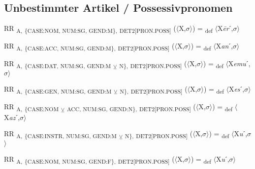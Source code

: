 {\subsection{Unbestimmter Artikel / Possessivpronomen}

\begin{exe}
 RR \textsubscript{A,} \textsubscript{\{CASE:NOM, NUM:SG, GEND:M\},} \textsubscript{DET2[PRON.POSS]} ($\langle$X,$\sigma $$\rangle$) = \textsubscript{def} $\langle$X\textit{\=er}ˊ,$\sigma $$\rangle$
\end{exe}

\begin{exe}
 RR \textsubscript{A,} \textsubscript{\{CASE:ACC, NUM:SG, GEND:M\},} \textsubscript{DET2[PRON.POSS]} ($\langle$X,$\sigma $$\rangle$) = \textsubscript{def} $\langle$X\textit{an}ˊ,$\sigma $$\rangle$
\end{exe}

\begin{exe}
 RR \textsubscript{A,} \textsubscript{\{CASE:DAT, NUM:SG, GEND:M} \textsubscript{${\veebar}$}\textsubscript{ N\},} \textsubscript{DET2[PRON.POSS]} ($\langle$X,$\sigma $$\rangle$) = \textsubscript{def} $\langle$X\textit{emu}ˊ,$\sigma $$\rangle$
\end{exe}

\begin{exe}
 RR \textsubscript{A,} \textsubscript{\{CASE:GEN, NUM:SG, GEND:M} \textsubscript{${\veebar}$}\textsubscript{ N\},} \textsubscript{DET2[PRON.POSS]} ($\langle$X,$\sigma $$\rangle$) = \textsubscript{def} $\langle$X\textit{es}ˊ,$\sigma $$\rangle$
\end{exe}

\begin{exe}
 RR \textsubscript{A,} \textsubscript{\{CASE:NOM} \textsubscript{${\veebar}$}\textsubscript{ ACC, NUM:SG, GEND:N\},} \textsubscript{DET2[PRON.POSS]} ($\langle$X,$\sigma $$\rangle$) = \textsubscript{def} $\langle$X\textit{az}ˊ,$\sigma $$\rangle$
\end{exe}

\begin{exe}
 RR \textsubscript{A,} \textsubscript{\{CASE:INSTR, NUM:SG, GEND:M} \textsubscript{${\veebar}$}\textsubscript{ N\},} \textsubscript{DET2[PRON.POSS]} ($\langle$X,$\sigma $$\rangle$) = \textsubscript{def} $\langle$X\textit{u}ˊ,$\sigma $$\rangle$
\end{exe}

\begin{exe}
 RR \textsubscript{A,} \textsubscript{\{CASE:NOM, NUM:SG, GEND:F\},} \textsubscript{DET2[PRON.POSS]} ($\langle$X,$\sigma $$\rangle$) = \textsubscript{def} $\langle$X\textit{u}ˊ,$\sigma $$\rangle$
\end{exe}

}
